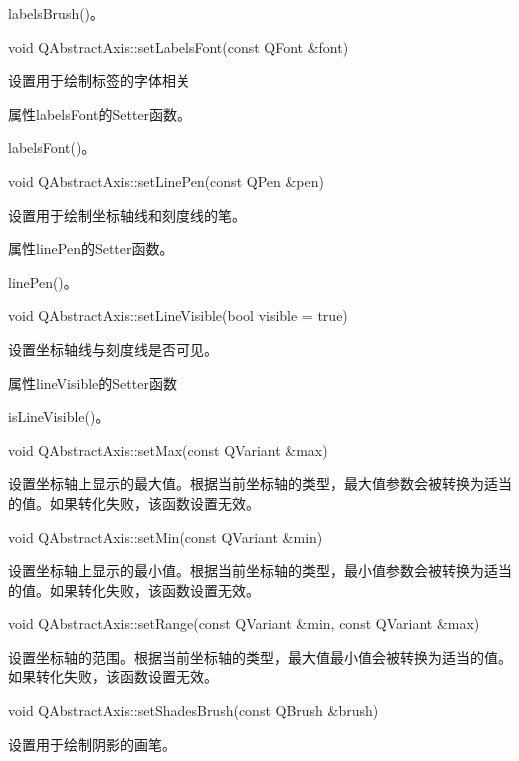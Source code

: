 \begin{notice}[另请参阅]
labelsBrush()。
\end{notice}

void QAbstractAxis::setLabelsFont(const QFont \&font) 

设置用于绘制标签的字体相关 

\begin{notice}
属性labelsFont的Setter函数。
\end{notice}
    
\begin{notice}[另请参阅]
labelsFont()。
\end{notice}
    
void QAbstractAxis::setLinePen(const QPen \&pen) 

设置用于绘制坐标轴线和刻度线的笔。 


\begin{notice}
属性linePen的Setter函数。
\end{notice}
 
\begin{notice}[另请参阅]
linePen()。
\end{notice}

void QAbstractAxis::setLineVisible(bool visible = true) 

设置坐标轴线与刻度线是否可见。 

\begin{notice}
属性lineVisible的Setter函数
\end{notice}
     
\begin{notice}[另请参阅]
isLineVisible()。
\end{notice}

void QAbstractAxis::setMax(const QVariant \&max) 

设置坐标轴上显示的最大值。根据当前坐标轴的类型，最大值参数会被转换为适当的值。如果转化失败，该函数设置无效。

void QAbstractAxis::setMin(const QVariant \&min) 

设置坐标轴上显示的最小值。根据当前坐标轴的类型，最小值参数会被转换为适当的值。如果转化失败，该函数设置无效。

void QAbstractAxis::setRange(const QVariant \&min, const QVariant
\&max) 

设置坐标轴的范围。根据当前坐标轴的类型，最大值最小值会被转换为适当的值。如果转化失败，该函数设置无效。

void QAbstractAxis::setShadesBrush(const QBrush \&brush)

设置用于绘制阴影的画笔。 

